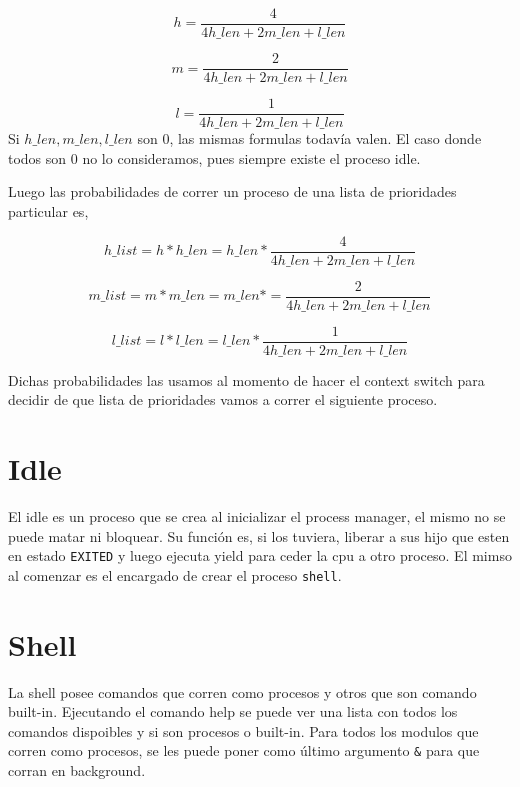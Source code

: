 \documentclass{article}
\begin{document}
\begin{equation*}
h = \frac{4}{4 h\_len + 2 m\_len + l\_len}
\end{equation*}

\begin{equation*}
m = \frac{2}{4 h\_len + 2 m\_len + l\_len}
\end{equation*}

\begin{equation*}
l = \frac{1}{4 h\_len + 2 m\_len + l\_len}
\end{equation*}
Si $h\_len, m\_len, l\_len$ son 0, las mismas formulas todavía valen. El caso donde todos son 0 no lo consideramos, pues siempre existe el proceso idle.

Luego las probabilidades de correr un proceso de una lista de prioridades particular es,

\begin{equation*}
h\_list = h * h\_len = h\_len *  \frac{4}{4 h\_len + 2 m\_len + l\_len}
\end{equation*}

\begin{equation*}
m\_list = m * m\_len = m\_len * = \frac{2}{4 h\_len + 2 m\_len + l\_len}
\end{equation*}

\begin{equation*}
l\_list = l * l\_len = l\_len * \frac{1}{4 h\_len + 2 m\_len + l\_len}
\end{equation*}

Dichas probabilidades las usamos al momento de hacer el context switch para decidir de que lista de prioridades vamos a correr el siguiente proceso.

\section {Idle}
El idle es un proceso que se crea al inicializar el process manager, el mismo no se puede matar ni bloquear. Su función es, si los tuviera, liberar a sus hijo que esten en estado \texttt{EXITED} y luego ejecuta yield para ceder la cpu a otro proceso. El mimso al comenzar es el encargado de crear el proceso \texttt{shell}.

\section {Shell}
La shell posee comandos que corren como procesos y otros que son comando built-in. Ejecutando el comando help se puede ver una lista con todos los comandos dispoibles y si son procesos o built-in. Para todos los modulos que corren como procesos, se les puede poner como último argumento \texttt{\&} para que corran en background.
\end{document}
